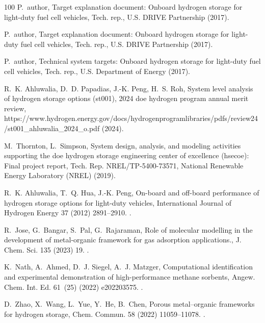 \documentclass[review]{elsarticle}
\begin{document}
\begin{thebibliography}{100}
P.~author, Target explanation document: Onboard hydrogen storage for light-duty
  fuel cell vehicles, Tech. rep., U.S. DRIVE Partnership (2017).

P.~author, Target explanation document: Onboard hydrogen storage for light-duty
  fuel cell vehicles, Tech. rep., U.S. DRIVE Partnership (2017).

P.~author, Technical system targets: Onboard hydrogen storage for light-duty
  fuel cell vehicles, Tech. rep., U.S. Department of Energy (2017).

R.~K. Ahluwalia, D.~D. Papadias, J.-K. Peng, H.~S. Roh, System level analysis
  of hydrogen storage options (st001), 2024 doe hydrogen program annual merit
  review,
  {https://www.hydrogen.energy.gov/docs/hydrogenprogramlibraries/pdfs/review24/st001\_ahluwalia\_2024\_o.pdf}
  (2024).

M.~Thornton, L.~Simpson, System design, analysis, and modeling activities
  supporting the doe hydrogen storage engineering center of excellence
  (hsecoe): Final project report, Tech. Rep. NREL/TP-5400-73571, National
  Renewable Energy Laboratory (NREL) (2019).

R.~K. Ahluwalia, T.~Q. Hua, J.-K. Peng, On-board and off-board performance of
  hydrogen storage options for light-duty vehicles, International Journal of
  Hydrogen Energy 37 (2012) 2891--2910.
\newblock \href {https://doi.org/10.1016/j.ijhydene.2011.05.040}
  {}.

R.~Jose, G.~Bangar, S.~Pal, G.~Rajaraman, Role of molecular modelling in the
  development of metal-organic framework for gas adsorption applications., J.
  Chem. Sci. 135 (2023) 19.
\newblock \href {https://doi.org/10.1007/s12039-022-02130-5}
  {}.

K.~Nath, A.~Ahmed, D.~J. Siegel, A.~J. Matzger, Computational identification
  and experimental demonstration of high-performance methane sorbents, Angew.
  Chem. Int. Ed. 61~(25) (2022) e202203575.
\newblock \href {https://doi.org/10.1002/anie.202203575}
  {}.

D.~Zhao, X.~Wang, L.~Yue, Y.~He, B.~Chen, Porous metal–organic frameworks for
  hydrogen storage, Chem. Commun. 58 (2022) 11059--11078.
\newblock \href {https://doi.org/10.1039/D2CC04036K}
  {}.


\end{thebibliography}
\end{document}
